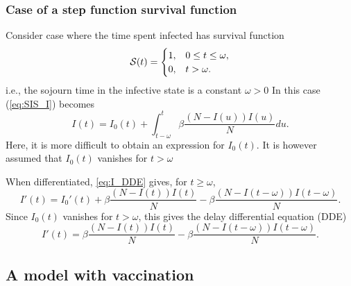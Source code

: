 \documentclass[aspectratio=169]{beamer}\usepackage[]{graphicx}\usepackage[]{xcolor}
\begin{document}
\begin{frame}\frametitle{Case of a step function survival function}
Consider case where the time spent infected has survival function 
\[
\S(t)=\begin{cases}
1, & 0\leq t\leq\omega,\\
0, & t>\omega.
\end{cases}
\]
i.e., the sojourn time in the infective state is a constant
$\omega>0$
\vfill
In this case (\ref{eq:SIS_I}) becomes
\begin{equation}\label{eq:I_DDE}
I(t)=I_0(t)+\int_{t-\omega}^t \beta\frac{(N-I(u))I(u)}{N} du.
\end{equation}
Here, it is more difficult to obtain an expression for $I_0(t)$. It is however assumed that $I_0(t)$ vanishes for $t>\omega$
\end{frame}

\begin{frame}
When differentiated, \eqref{eq:I_DDE} gives, for $t\geq\omega$,
\[
I'(t)=I_0'(t)+\beta\frac{(N-I(t))I(t)}{N}
-\beta\frac{\left(N-I(t-\omega)\right)I(t-\omega)}{N}.
\]
Since $I_0(t)$ vanishes for $t>\omega$, this gives the delay
differential equation (DDE)
\[
I'(t)=\beta\frac{(N-I(t))I(t)}{N}
-\beta\frac{(N-I(t-\omega))I(t-\omega)}{N}.
\]
\end{frame}






\subsection{A model with vaccination}

\nocite{ArinoCookeVdDVelasco2004}
\end{document}
